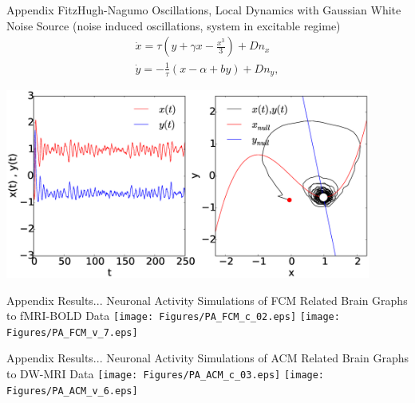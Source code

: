 \documentclass{beamer}
\begin{document}
\begin{frame}{Appendix}
\footnotesize{FitzHugh-Nagumo Oscillations, Local Dynamics with Gaussian White Noise Source (noise induced oscillations, system in excitable regime) }
\begin{subequations}
\begin{align}\dot{x} = \tau \left( y + \gamma x - \frac{x^3}{3} \right) + Dn_x  \label{eqn: frobenius 1}\\  \dot{y} = -\frac{1}{\tau} (x - \alpha + b y ) + Dn_y , \label{eqn: frobenius 2 }   \end{align} 
\end{subequations}

 \centering
 \includegraphics[width=0.9\textwidth]{Figures/FHN_noise.eps}

\end{frame}












\begin{frame}{Appendix}
Results...
\footnotesize{Neuronal Activity Simulations of FCM Related Brain Graphs to fMRI-BOLD Data} 
\break
\break
\break
\centering
    \texttt{[image: Figures/PA\_FCM\_c\_02.eps]} 
	\texttt{[image: Figures/PA\_FCM\_v\_7.eps]} 
	
\end{frame}




\begin{frame}{Appendix}
Results...\break
\footnotesize{Neuronal Activity Simulations of ACM Related Brain Graphs to DW-MRI Data} 
\break
\break
\break
\centering
    \texttt{[image: Figures/PA\_ACM\_c\_03.eps]} 
	\texttt{[image: Figures/PA\_ACM\_v\_6.eps]} 
	
\end{frame}
\end{document}
